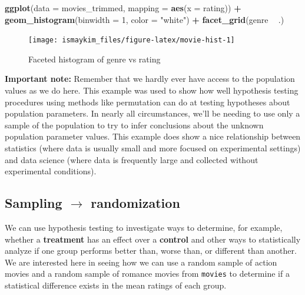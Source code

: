 \documentclass[12pt, krantz2,]{krantz}
\makeatletter
\newenvironment{Shaded}{\begin{snugshade}}{\end{snugshade}}
\newcommand{\DataTypeTok}[1]{\textcolor[rgb]{0.27,0.27,0.27}{#1}}
\newcommand{\DecValTok}[1]{\textcolor[rgb]{0.06,0.06,0.06}{#1}}
\newcommand{\KeywordTok}[1]{\textcolor[rgb]{0.27,0.27,0.27}{\textbf{#1}}}
\newcommand{\NormalTok}[1]{#1}
\newcommand{\OperatorTok}[1]{\textcolor[rgb]{0.43,0.43,0.43}{\textbf{#1}}}
\newcommand{\StringTok}[1]{\textcolor[rgb]{0.5,0.5,0.5}{#1}}
\newenvironment{kframe}{%
\medskip{}
\setlength{\fboxsep}{.8em}
 \def\at@end@of@kframe{}%
 \ifinner\ifhmode%
  \def\at@end@of@kframe{\end{minipage}}%
  \begin{minipage}{\columnwidth}%
 \fi\fi%
 \def\FrameCommand##1{\hskip\@totalleftmargin \hskip-\fboxsep
 \colorbox{shadecolor}{##1}\hskip-\fboxsep
     \hskip-\linewidth \hskip-\@totalleftmargin \hskip\columnwidth}%
 \MakeFramed {\advance\hsize-\width
   \@totalleftmargin\z@ \linewidth\hsize
   \@setminipage}}%
 {\par\unskip\endMakeFramed%
 \at@end@of@kframe}
\renewenvironment{Shaded}{\begin{kframe}}{\end{kframe}}
\makeatother
\begin{document}
\begin{Shaded}
\begin{Highlighting}[]
\KeywordTok{ggplot}\NormalTok{(}\DataTypeTok{data =}\NormalTok{ movies_trimmed, }\DataTypeTok{mapping =} \KeywordTok{aes}\NormalTok{(}\DataTypeTok{x =}\NormalTok{ rating)) }\OperatorTok{+}
\StringTok{  }\KeywordTok{geom_histogram}\NormalTok{(}\DataTypeTok{binwidth =} \DecValTok{1}\NormalTok{, }\DataTypeTok{color =} \StringTok{"white"}\NormalTok{) }\OperatorTok{+}
\StringTok{  }\KeywordTok{facet_grid}\NormalTok{(genre }\OperatorTok{~}\StringTok{ }\NormalTok{.)}
\end{Highlighting}
\end{Shaded}

\begin{figure}

{\centering \texttt{[image: ismaykim\_files/figure-latex/movie-hist-1]} 

}

\caption{Faceted histogram of genre vs rating}\label{fig:movie-hist}
\end{figure}

\textbf{Important note:} Remember that we hardly ever have access to the population values as we do here. This example was used to show how well hypothesis testing procedures using methods like permutation can do at testing hypotheses about population parameters. In nearly all circumstances, we'll be needing to use only a sample of the population to try to infer conclusions about the unknown population parameter values. This example does show a nice relationship between statistics (where data is usually small and more focused on experimental settings) and data science (where data is frequently large and collected without experimental conditions).

\hypertarget{sampling-rightarrow-randomization}{%
\subsection{\texorpdfstring{Sampling \(\rightarrow\) randomization}{Sampling \textbackslash{}rightarrow randomization}}\label{sampling-rightarrow-randomization}}

We can use hypothesis testing to investigate ways to determine, for example, whether a \textbf{treatment} has an effect over a \textbf{control} and other ways to statistically analyze if one group performs better than, worse than, or different than another. We are interested here in seeing how we can use a random sample of action movies and a random sample of romance movies from \texttt{movies} to determine if a statistical difference exists in the mean ratings of each group.
\end{document}
